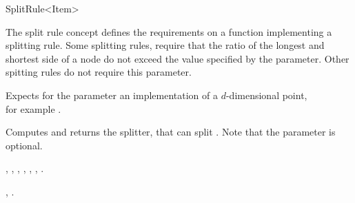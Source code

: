 

\begin{ccRefFunctionObjectConcept}{SplitRule<Item>}



\ccDefinition
  
The split rule concept defines the requirements on a function implementing a
splitting rule. Some splitting rules, require that the ratio of the longest and shortest side
of a node do not exceed the value specified by the  parameter.  Other
spitting rules do not require this parameter.

\ccParameters

Expects for the parameter  an implementation 
of a $d$-dimensional point, \\
for example .

\ccTypes


\ccCreation
{}  %



{Computes and returns the splitter, that can split . Note that the parameter 
is optional.}

\ccHasModels

,
,
,
,
,
,
.

\ccSeeAlso

,
.


\end{ccRefFunctionObjectConcept}


